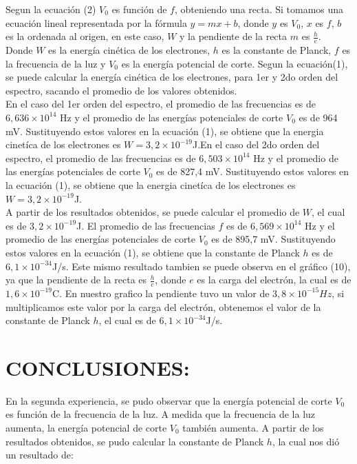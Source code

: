 \documentclass[a4paper]{article}
\begin{document}
      \indent Segun la ecuación (2) $V_{0}$ es función de $f$, obteniendo una recta. Si tomamos una ecuación lineal representada por la fórmula $y = mx + b$, donde $y$ es $V_{0}$, $x$ es $f$, $b$ es la ordenada al origen, en este caso, $W$ y  la pendiente de la recta $m$ es $\frac{h}{e}$.\\
      \indent Donde $W$ es la energía cinética de los electrones, $h$ es la constante de Planck, $f$ es la frecuencia de la luz y $V_{0}$ es la energía potencial de corte. Segun la ecuación(1), se puede calcular la energía cinética de los electrones, para 1er y 2do orden del espectro, sacando el promedio de los valores obtenidos.\\
      \indent En el caso del 1er orden del espectro, el promedio de las frecuencias es de $6,636 \times 10^{14}$ Hz y el promedio de las energías potenciales de corte $V_{0}$ es de 964 mV. Sustituyendo estos valores en la ecuación (1), se obtiene que la energia cinetíca de los electrones es $W = 3,2 \times 10^{-19}$J.En el caso del 2do orden del espectro, el promedio de las frecuencias es de $6,503 \times 10^{14}$ Hz y el promedio de las energías potenciales de corte $V_{0}$ es de 827,4 mV. Sustituyendo estos valores en la ecuación (1), se obtiene que la energia cinetíca de los electrones es $W = 3,2 \times 10^{-19}$J.\\
      \indent A partir de los resultados obtenidos, se puede calcular el promedio de $W$, el cual es de $3,2 \times 10^{-19}$J. El promedio de las frecuencias $f$ es de $6,569 \times 10^{14}$ Hz y el promedio de las energías potenciales de corte $V_{0}$ es de 895,7 mV. Sustituyendo estos valores en la ecuación (1), se obtiene que la constante de Planck $h$ es de $6,1 \times 10^{-34}$J/s. Este mismo resultado tambien se puede observa en el gráfico (10), ya que la pendiente de la recta es $\frac{h}{e}$, donde $e$ es la carga del electrón, la cual es de $1,6 \times 10^{-19}$C. En nuestro grafico la pendiente tuvo un valor de $3,8 \times 10^{-15} Hz$, si multiplicamos este valor por la carga del electrón, obtenemos el valor de la constante de Planck $h$, el cual es de $6,1 \times 10^{-34}$J/s.\\
      \vspace{5mm}
      
    \section{CONCLUSIONES:}
    \indent En la segunda experiencia, se pudo observar que la energía potencial de corte $V_{0}$ es función de la frecuencia de la luz. A medida que la frecuencia de la luz aumenta, la energía potencial de corte $V_{0}$ también aumenta. A partir de los resultados obtenidos, se pudo calcular la constante de Planck $h$, la cual nos dió un resultado de:
    
\end{document}
